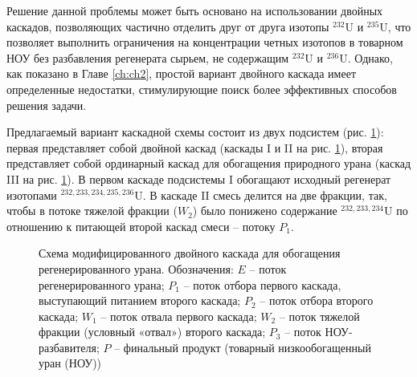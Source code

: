 Решение данной проблемы может быть основано на использовании двойных каскадов, позволяющих частично отделить друг от друга изотопы $^{232}$U и $^{235}$U, что позволяет выполнить ограничения на концентрации четных изотопов в товарном НОУ без разбавления регенерата сырьем, не содержащим $^{232}$U и $^{236}$U. Однако, как показано в Главе \ref{ch:ch2}, простой вариант двойного каскада имеет определенные недостатки, стимулирующие поиск более эффективных способов решения задачи. 

Предлагаемый вариант каскадной схемы состоит из двух подсистем (рис. \ref{p2left}): первая представляет собой двойной каскад (каскады I и II на рис. \ref{p2left}), вторая представляет собой ординарный каскад для обогащения природного урана (каскад III на рис. \ref{p2left}). В первом каскаде подсистемы I обогащают исходный регенерат изотопами $^{232,233,234,235,236}$U. В каскаде II смесь делится на две фракции, так, чтобы в потоке тяжелой фракции ($W_2$) было понижено содержание $^{232,233,234}$U по отношению к питающей второй каскад смеси -- потоку $P_1$. 

\begin{figure}[ht]
    \caption{Схема модифицированного двойного каскада для обогащения регенерированного урана. Обозначения: $E$ -- поток регенерированного урана; $P_1$ -- поток отбора первого каскада, выступающий питанием второго каскада; $P_2$ -- поток отбора второго каскада; $W_1$ -- поток отвала первого каскада; $W_2$ -- поток тяжелой фракции (условный «отвал») второго каскада; $P_3$ -- поток НОУ-разбавителя; $P$ -- финальный продукт (товарный низкообогащенный уран (НОУ))}\label{p2left}
\end{figure}

